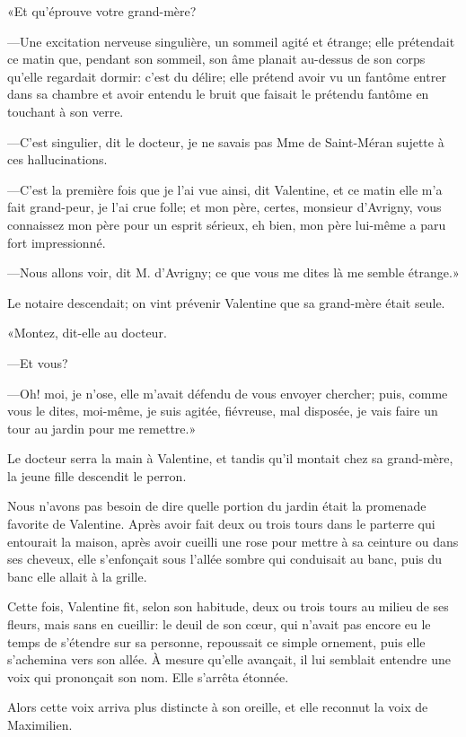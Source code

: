 «Et qu'éprouve votre grand-mère? 

—Une excitation nerveuse singulière, un sommeil agité et étrange; elle prétendait ce matin que, pendant son sommeil, son âme planait au-dessus de son corps qu'elle regardait dormir: c'est du délire; elle prétend avoir vu un fantôme entrer dans sa chambre et avoir entendu le bruit que faisait le prétendu fantôme en touchant à son verre. 

—C'est singulier, dit le docteur, je ne savais pas Mme de Saint-Méran sujette à ces hallucinations. 

—C'est la première fois que je l'ai vue ainsi, dit Valentine, et ce matin elle m'a fait grand-peur, je l'ai crue folle; et mon père, certes, monsieur d'Avrigny, vous connaissez mon père pour un esprit sérieux, eh bien, mon père lui-même a paru fort impressionné. 

—Nous allons voir, dit M. d'Avrigny; ce que vous me dites là me semble étrange.» 

Le notaire descendait; on vint prévenir Valentine que sa grand-mère était seule. 

«Montez, dit-elle au docteur. 

—Et vous? 

—Oh! moi, je n'ose, elle m'avait défendu de vous envoyer chercher; puis, comme vous le dites, moi-même, je suis agitée, fiévreuse, mal disposée, je vais faire un tour au jardin pour me remettre.» 

Le docteur serra la main à Valentine, et tandis qu'il montait chez sa grand-mère, la jeune fille descendit le perron. 

Nous n'avons pas besoin de dire quelle portion du jardin était la promenade favorite de Valentine. Après avoir fait deux ou trois tours dans le parterre qui entourait la maison, après avoir cueilli une rose pour mettre à sa ceinture ou dans ses cheveux, elle s'enfonçait sous l'allée sombre qui conduisait au banc, puis du banc elle allait à la grille. 

Cette fois, Valentine fit, selon son habitude, deux ou trois tours au milieu de ses fleurs, mais sans en cueillir: le deuil de son cœur, qui n'avait pas encore eu le temps de s'étendre sur sa personne, repoussait ce simple ornement, puis elle s'achemina vers son allée. À mesure qu'elle avançait, il lui semblait entendre une voix qui prononçait son nom. Elle s'arrêta étonnée. 

Alors cette voix arriva plus distincte à son oreille, et elle reconnut la voix de Maximilien. 